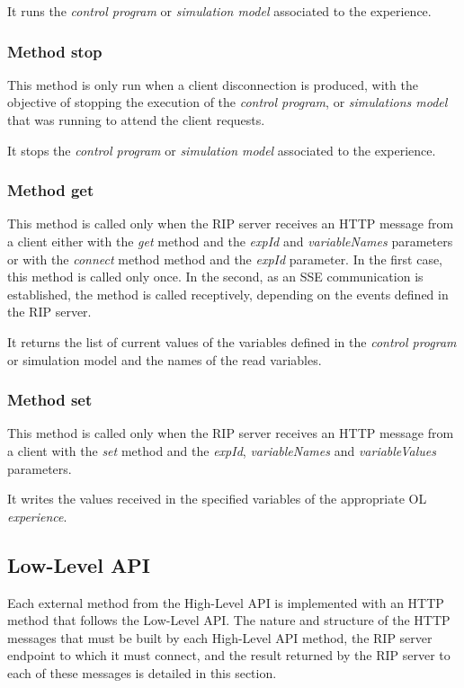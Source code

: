 It runs the \textit{control program} or \textit{simulation model} associated to the experience.

\subsubsection{Method stop}
This method is only run when a client disconnection is produced, with the objective of stopping the execution of the \textit{control program}, or \textit{simulations model} that was running to attend the client requests. 

It stops the \textit{control program} or \textit{simulation model} associated to the experience.

\subsubsection{Method get}
This method is called only when the RIP server receives an HTTP message from a client either with the \textit{get} method and the \textit{expId} and \textit{variableNames} parameters or with the \textit{connect} method method and the \textit{expId} parameter. In the first case, this method is called only once. In the second, as an SSE communication is established, the method is called receptively, depending on the events defined in the RIP server.

It returns the list of current values of the variables defined in the \textit{control program} or {simulation model} and the names of the read variables.

\subsubsection{Method set}
This method is called only when the RIP server receives an HTTP message from a client with the \textit{set} method and the \textit{expId}, \textit{variableNames} and \textit{variableValues} parameters.

It writes the values received in the specified variables of the appropriate OL \textit{experience}.

\subsection{Low-Level API}
Each external method from the High-Level API is implemented with an HTTP method that follows the Low-Level API. The nature and structure of the HTTP messages that must be built by each High-Level API method, the RIP server endpoint to which it must connect, and the result returned by the RIP server to each of these messages is detailed in this section.

